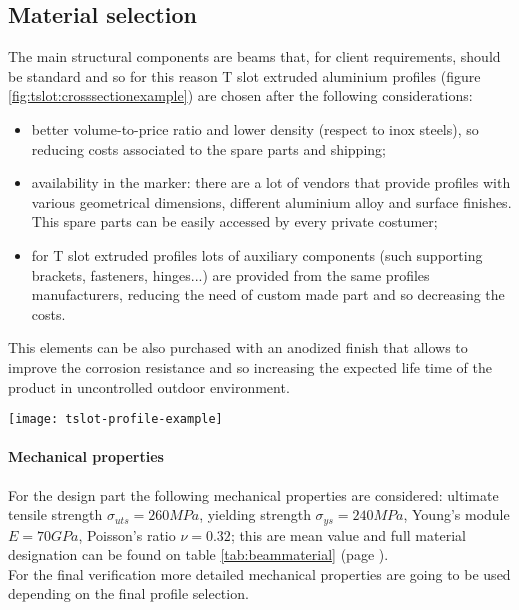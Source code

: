 \subsection{Material selection}
	
	The main structural components are beams that, for client requirements, should be standard and so for this reason T slot extruded aluminium profiles (figure \ref{fig:tslot:crosssectionexample}) are chosen after the following considerations:
	\begin{itemize}
		\item better volume-to-price ratio and lower density (respect to inox steels), so reducing costs associated to the spare parts and shipping;
		\item availability in the marker: there are a lot of vendors that provide profiles with various geometrical dimensions, different aluminium alloy and surface finishes. This spare parts can be easily accessed by every private costumer;
		\item for T slot extruded profiles lots of auxiliary components (such supporting brackets, fasteners, hinges...)  are provided from the same profiles manufacturers, reducing the need of custom made part and so decreasing the costs.
	\end{itemize}

	This elements can be also purchased with an anodized finish that allows to improve the corrosion resistance and so increasing the expected life time of the product in uncontrolled outdoor environment.
	
	\begin{SCfigure}[1.5][bh]
		\centering\texttt{[image: tslot-profile-example]}
		\caption{technical drawing of a T-slot profile's cross-section. The particular sketch represent the model \texttt{TS40-40LM} by Tslots \cite{tslot-ds}.}
		\label{fig:tslot:crosssectionexample}
	\end{SCfigure}
	
	\paragraph{Mechanical properties} For the design part the following mechanical properties are considered: ultimate tensile strength $\sigma_{uts} = 260 MPa$, yielding strength $\sigma_{ys} = 240 MPa$, Young's module $E = 70 GPa$, Poisson's ratio $\nu = 0.32$; this are mean value and full material designation can be found on table \ref{tab:beammaterial} (page \pageref{tab:beammaterial}).\\
	For the final verification more detailed mechanical properties are going to be used depending on the final profile selection.
	
	
	
		
	
	
	
	
	
	
	
	
	
	
	
	
	